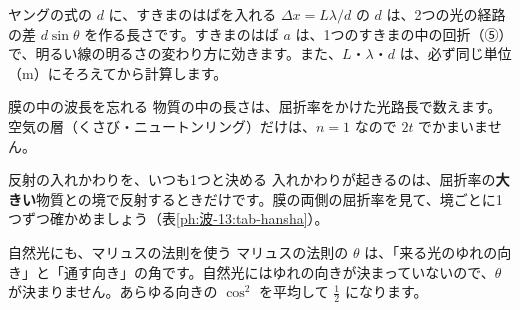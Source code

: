 \begin{tsumazuki}{ヤングの式の $d$ に、すきまのはばを入れる}
$\Delta x=L\lambda/d$ の $d$ は、2つの光の経路の差 $d\sin\theta$ を作る長さです。すきまのはば $a$ は、1つのすきまの中の回折（⑤）で、明るい線の明るさの変わり方に効きます。また、$L$・$\lambda$・$d$ は、必ず同じ単位（m）にそろえてから計算します。
\end{tsumazuki}
\begin{tsumazuki}{膜の中の波長を忘れる}
物質の中の長さは、屈折率をかけた光路長で数えます。空気の層（くさび・ニュートンリング）だけは、$n=1$ なので $2t$ でかまいません。
\end{tsumazuki}
\begin{tsumazuki}{反射の入れかわりを、いつも1つと決める}
入れかわりが起きるのは、屈折率の\textbf{大きい}物質との境で反射するときだけです。膜の両側の屈折率を見て、境ごとに1つずつ確かめましょう（表\ref{ph:波-13:tab-hansha}）。
\end{tsumazuki}
\begin{tsumazuki}{自然光にも、マリュスの法則を使う}
マリュスの法則の $\theta$ は、「来る光のゆれの向き」と「通す向き」の角です。自然光にはゆれの向きが決まっていないので、$\theta$ が決まりません。あらゆる向きの $\cos^2$ を平均して $\tfrac12$ になります。
\end{tsumazuki}

